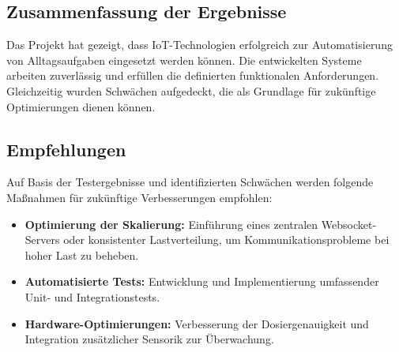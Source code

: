 \subsection{Zusammenfassung der Ergebnisse}

Das Projekt hat gezeigt, dass IoT-Technologien erfolgreich zur Automatisierung von Alltagsaufgaben eingesetzt werden können. Die entwickelten Systeme arbeiten zuverlässig und erfüllen die definierten funktionalen Anforderungen. Gleichzeitig wurden Schwächen aufgedeckt, die als Grundlage für zukünftige Optimierungen dienen können.

\subsection{Empfehlungen}

Auf Basis der Testergebnisse und identifizierten Schwächen werden folgende Maßnahmen für zukünftige Verbesserungen empfohlen:
\begin{itemize}
  \item \textbf{Optimierung der Skalierung:} Einführung eines zentralen Websocket-Servers oder konsistenter Lastverteilung, um Kommunikationsprobleme bei hoher Last zu beheben.
  \item \textbf{Automatisierte Tests:} Entwicklung und Implementierung umfassender Unit- und Integrationstests.
  \item \textbf{Hardware-Optimierungen:} Verbesserung der Dosiergenauigkeit und Integration zusätzlicher Sensorik zur Überwachung.
\end{itemize}


